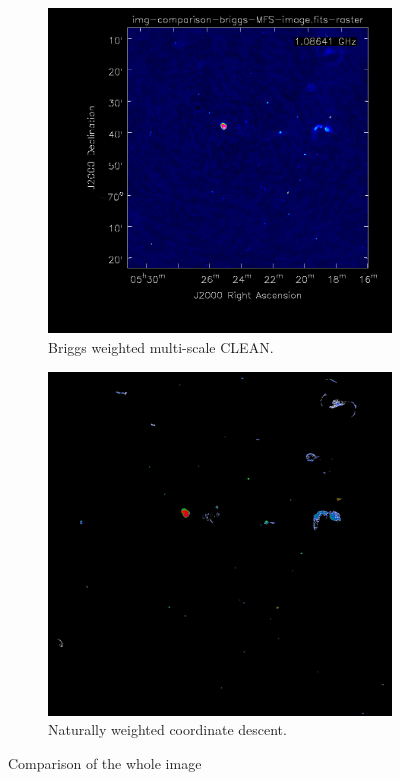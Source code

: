\begin{figure}[h]
	\centering
	\begin{subfigure}[b]{0.4\linewidth}
		\includegraphics[width=1.00\linewidth]{./chapters/10.results/cleancomp/clean_briggs.png}
		\caption{Briggs weighted multi-scale CLEAN.}
		\label{results:comp:clean}
	\end{subfigure}
	\begin{subfigure}[b]{0.40\linewidth}
		\includegraphics[width=1.00\linewidth]{./chapters/10.results/cleancomp/cd.png}
		\caption{Naturally weighted coordinate descent.}
		\label{results:comp:cd}
	\end{subfigure}
	\caption{Comparison of the whole image}
	\label{results:cleancomp:figure}
\end{figure}

